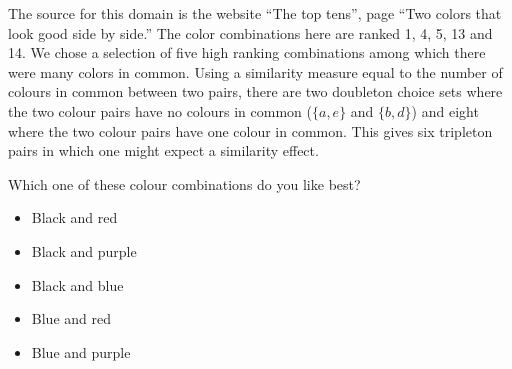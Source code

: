 
The source for this domain is the website ``The top tens'', page ``Two colors that look good side by side.''
The color combinations here are ranked 1, 4, 5, 13 and 14.
We chose a selection of five high ranking combinations among which there were many colors
in common.
Using a similarity measure equal to the number of colours in common between two pairs, there are two doubleton choice sets where the two colour pairs have no colours in common ($\{a,e\}$ and $\{b,d\}$) and eight where the two colour pairs have one colour in common.
This gives six tripleton pairs in which one might expect a similarity effect.

\begin{tcolorbox}
Which one of these colour combinations do you like best?

\begin{itemize}
	\setlength\itemsep{-5pt}
	\item Black and red
	\item Black and purple
	\item Black and blue
	\item Blue and red
	\item Blue and purple
\end{itemize}
\end{tcolorbox}
